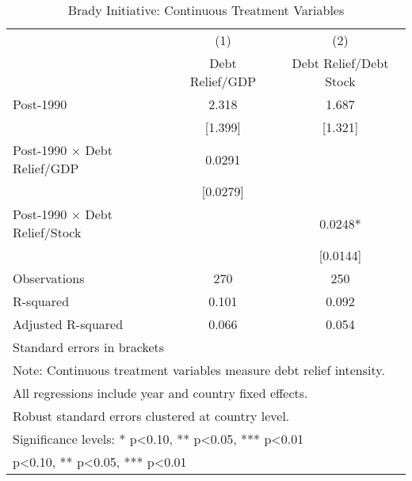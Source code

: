 \begin{table}[htbp]\centering
\def\sym#1{\ifmmode^{#1}\else\(^{#1}\)\fi}
\caption{Brady Initiative: Continuous Treatment Variables}
\begin{tabular}{l*{2}{c}}
\toprule
                    &\multicolumn{1}{c}{(1)}&\multicolumn{1}{c}{(2)}\\
                    &\multicolumn{1}{c}{Debt Relief/GDP}&\multicolumn{1}{c}{Debt Relief/Debt Stock}\\
\midrule
Post-1990           &       2.318   &       1.687   \\
                    &     [1.399]   &     [1.321]   \\
Post-1990 $\times$ Debt Relief/GDP&      0.0291   &               \\
                    &    [0.0279]   &               \\
Post-1990 $\times$ Debt Relief/Stock&               &      0.0248*  \\
                    &               &    [0.0144]   \\
\midrule
Observations        &         270   &         250   \\
R-squared           &       0.101   &       0.092   \\
Adjusted R-squared  &       0.066   &       0.054   \\
\bottomrule
\multicolumn{3}{l}{\footnotesize Standard errors in brackets}\\
\multicolumn{3}{l}{\footnotesize Note: Continuous treatment variables measure debt relief intensity.}\\
\multicolumn{3}{l}{\footnotesize All regressions include year and country fixed effects.}\\
\multicolumn{3}{l}{\footnotesize Robust standard errors clustered at country level.}\\
\multicolumn{3}{l}{\footnotesize Significance levels: * p<0.10, ** p<0.05, *** p<0.01}\\
\multicolumn{3}{l}{\footnotesize * p<0.10, ** p<0.05, *** p<0.01}\\
\end{tabular}
\end{table}
